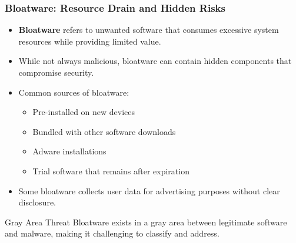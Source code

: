 \documentclass{beamer}
\begin{document}
\begin{frame}
    \frametitle{Bloatware: Resource Drain and Hidden Risks}
    
    \begin{itemize}
        \item \textbf{Bloatware} refers to unwanted software that consumes excessive system resources while providing limited value.
        \item While not always malicious, bloatware can contain hidden components that compromise security.
        \item Common sources of bloatware:
            \begin{itemize}
                \item Pre-installed on new devices
                \item Bundled with other software downloads
                \item Adware installations
                \item Trial software that remains after expiration
            \end{itemize}
        \item Some bloatware collects user data for advertising purposes without clear disclosure.
    \end{itemize}
    
    \begin{block}{Gray Area Threat}
        Bloatware exists in a gray area between legitimate software and malware, making it challenging to classify and address.
    \end{block}
\end{frame}
\end{document}
